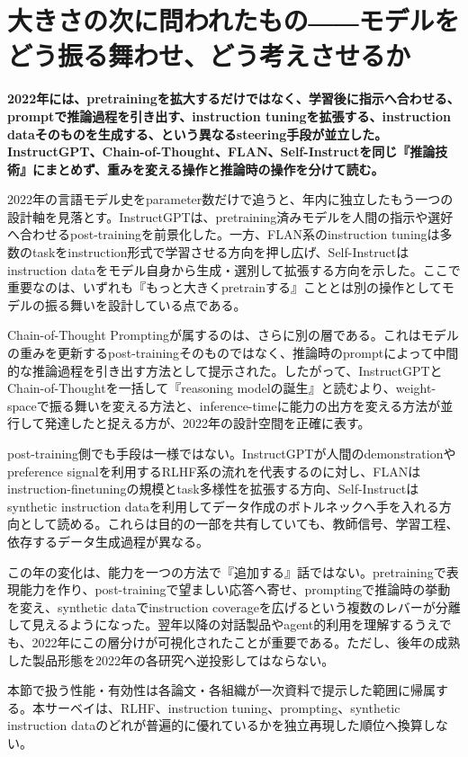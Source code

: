 \section{大きさの次に問われたもの――モデルをどう振る舞わせ、どう考えさせるか}
\noindent\textbf{2022年には、pretrainingを拡大するだけではなく、学習後に指示へ合わせる、promptで推論過程を引き出す、instruction tuningを拡張する、instruction dataそのものを生成する、という異なるsteering手段が並立した。InstructGPT、Chain-of-Thought、FLAN、Self-Instructを同じ『推論技術』にまとめず、重みを変える操作と推論時の操作を分けて読む。}\autocite{src-0c551201e765,src-87477ad8b476,src-a17359c66f6b,src-e58f1e9c8754,src-fadb2b92c538}

2022年の言語モデル史をparameter数だけで追うと、年内に独立したもう一つの設計軸を見落とす。InstructGPTは、pretraining済みモデルを人間の指示や選好へ合わせるpost-trainingを前景化した。一方、FLAN系のinstruction tuningは多数のtaskをinstruction形式で学習させる方向を押し広げ、Self-Instructはinstruction dataをモデル自身から生成・選別して拡張する方向を示した。ここで重要なのは、いずれも『もっと大きくpretrainする』こととは別の操作としてモデルの振る舞いを設計している点である。\autocite{src-0c551201e765,src-87477ad8b476,src-e58f1e9c8754,src-fadb2b92c538}


Chain-of-Thought Promptingが属するのは、さらに別の層である。これはモデルの重みを更新するpost-trainingそのものではなく、推論時のpromptによって中間的な推論過程を引き出す方法として提示された。したがって、InstructGPTとChain-of-Thoughtを一括して『reasoning modelの誕生』と読むより、weight-spaceで振る舞いを変える方法と、inference-timeに能力の出方を変える方法が並行して発達したと捉える方が、2022年の設計空間を正確に表す。\autocite{src-87477ad8b476,src-a17359c66f6b,src-e58f1e9c8754}


post-training側でも手段は一様ではない。InstructGPTが人間のdemonstrationやpreference signalを利用するRLHF系の流れを代表するのに対し、FLANはinstruction-finetuningの規模とtask多様性を拡張する方向、Self-Instructはsynthetic instruction dataを利用してデータ作成のボトルネックへ手を入れる方向として読める。これらは目的の一部を共有していても、教師信号、学習工程、依存するデータ生成過程が異なる。\autocite{src-0c551201e765,src-87477ad8b476,src-e58f1e9c8754,src-fadb2b92c538}


この年の変化は、能力を一つの方法で『追加する』話ではない。pretrainingで表現能力を作り、post-trainingで望ましい応答へ寄せ、promptingで推論時の挙動を変え、synthetic dataでinstruction coverageを広げるという複数のレバーが分離して見えるようになった。翌年以降の対話製品やagent的利用を理解するうえでも、2022年にこの層分けが可視化されたことが重要である。ただし、後年の成熟した製品形態を2022年の各研究へ逆投影してはならない。\autocite{src-0c551201e765,src-87477ad8b476,src-a17359c66f6b,src-e58f1e9c8754,src-fadb2b92c538}


\begin{claimboundary}
本節で扱う性能・有効性は各論文・各組織が一次資料で提示した範囲に帰属する。本サーベイは、RLHF、instruction tuning、prompting、synthetic instruction dataのどれが普遍的に優れているかを独立再現した順位へ換算しない。\autocite{src-87477ad8b476,src-a17359c66f6b,src-e58f1e9c8754}
\end{claimboundary}
